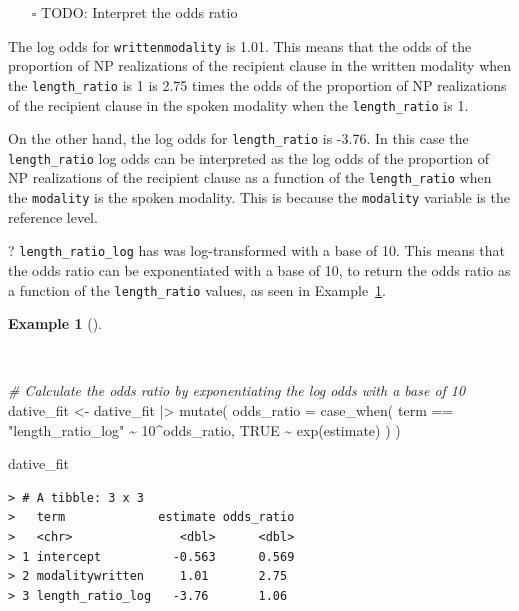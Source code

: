 \documentclass[
  letterpaper,
  DIV=11,
  numbers=noendperiod]{scrreprt}
\newenvironment{Shaded}{\begin{snugshade}}{\end{snugshade}}
\newcommand{\AttributeTok}[1]{\textcolor[rgb]{0.00,0.00,0.00}{#1}}
\newcommand{\CommentTok}[1]{\textcolor[rgb]{0.00,0.00,0.00}{\textit{#1}}}
\newcommand{\ConstantTok}[1]{\textcolor[rgb]{0.00,0.00,0.00}{#1}}
\newcommand{\DecValTok}[1]{\textcolor[rgb]{0.00,0.00,0.00}{#1}}
\newcommand{\FunctionTok}[1]{\textcolor[rgb]{0.00,0.00,0.00}{#1}}
\newcommand{\NormalTok}[1]{\textcolor[rgb]{0.00,0.00,0.00}{#1}}
\newcommand{\OtherTok}[1]{\textcolor[rgb]{0.00,0.00,0.00}{#1}}
\newcommand{\SpecialCharTok}[1]{\textcolor[rgb]{0.00,0.00,0.00}{#1}}
\newcommand{\StringTok}[1]{\textcolor[rgb]{0.00,0.00,0.00}{#1}}
\providecommand{\tightlist}{%
  \setlength{\itemsep}{0pt}\setlength{\parskip}{0pt}}\usepackage{longtable,booktabs,array}
\theoremstyle{definition}
\newtheorem{example}{Example}[chapter]
\theoremstyle{remark}
\begin{document}
\begin{itemize}
\tightlist
\item[$\square$]
  TODO: Interpret the odds ratio
\end{itemize}

The log odds for \texttt{writtenmodality} is 1.01. This means that the
odds of the proportion of NP realizations of the recipient clause in the
written modality when the \texttt{length\_ratio} is 1 is 2.75 times the
odds of the proportion of NP realizations of the recipient clause in the
spoken modality when the \texttt{length\_ratio} is 1.

On the other hand, the log odds for \texttt{length\_ratio} is -3.76. In
this case the \texttt{length\_ratio} log odds can be interpreted as the
log odds of the proportion of NP realizations of the recipient clause as
a function of the \texttt{length\_ratio} when the \texttt{modality} is
the spoken modality. This is because the \texttt{modality} variable is
the reference level.

? \texttt{length\_ratio\_log} has was log-transformed with a base of 10.
This means that the odds ratio can be exponentiated with a base of 10,
to return the odds ratio as a function of the \texttt{length\_ratio}
values, as seen in
Example~\ref{exm-ida-cat-logistic-regression-odds-ratio-10}.

\begin{example}[]\protect\hypertarget{exm-ida-cat-logistic-regression-odds-ratio-10}{}\label{exm-ida-cat-logistic-regression-odds-ratio-10}

~

\begin{Shaded}
\begin{Highlighting}[]
\CommentTok{\# Calculate the odds ratio by exponentiating the log odds with a base of 10}
\NormalTok{dative\_fit }\OtherTok{\textless{}{-}}
\NormalTok{  dative\_fit }\SpecialCharTok{|\textgreater{}}
  \FunctionTok{mutate}\NormalTok{(}
    \AttributeTok{odds\_ratio =} \FunctionTok{case\_when}\NormalTok{(}
\NormalTok{      term }\SpecialCharTok{==} \StringTok{"length\_ratio\_log"} \SpecialCharTok{\textasciitilde{}} \DecValTok{10}\SpecialCharTok{\^{}}\NormalTok{odds\_ratio,}
      \ConstantTok{TRUE} \SpecialCharTok{\textasciitilde{}} \FunctionTok{exp}\NormalTok{(estimate)}
\NormalTok{    )}
\NormalTok{  )}

\NormalTok{dative\_fit}
\end{Highlighting}
\end{Shaded}

\begin{verbatim}
> # A tibble: 3 x 3
>   term             estimate odds_ratio
>   <chr>               <dbl>      <dbl>
> 1 intercept          -0.563      0.569
> 2 modalitywritten     1.01       2.75 
> 3 length_ratio_log   -3.76       1.06
\end{verbatim}

\end{example}
\end{document}
